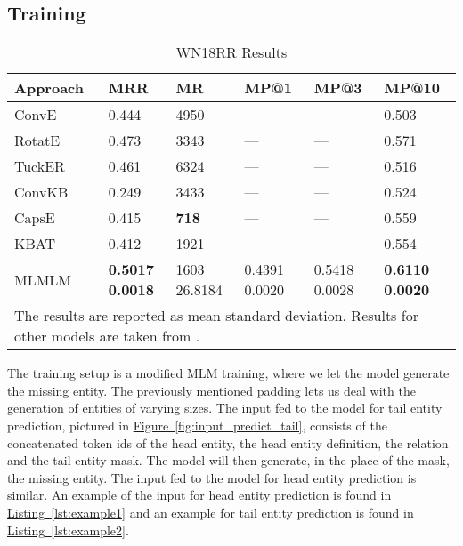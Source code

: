\documentclass[11pt,a4paper]{article}
\newcommand{\CiteT}[1]{\citet{#1}} \newcommand{\CiteP}[1]{~\citep{#1}} \newcommand{\CodeT}[1]{\texttt{#1}}
\newcommand{\RefFigure}[1]{\hyperref[#1]{Figure~\ref{#1}}}
\newcommand{\RefListing}[1]{\hyperref[#1]{Listing~\ref{#1}}}
\newcommand{\TableW}[3]{\begin{table*}[h!]
\begin{center}
  \caption{#3} 
  \vspace{-0.25\baselineskip}
  \label{#2}
  #1
\end{center}
\end{table*}}
\begin{document}
\subsection{Training}

\TableW{\begin{tabular}{m{}m{}m{0.1\textwidth}m{0.1\textwidth}m{0.1\textwidth}m{0.1\textwidth}}
    \toprule
    Approach & MRR  & MR  & MP@1  & MP@3  & MP@10 \\
    \midrule
    ConvE & 0.444 & 4950 & --- & --- & 0.503\\
    RotatE & 0.473 & 3343 & --- & --- & 0.571\\
    TuckER & 0.461 & 6324 & --- & --- & 0.516\\
    \midrule
    ConvKB & 0.249 & 3433 & --- & --- & 0.524\\
    CapsE & 0.415 & \textbf{718} & --- & --- & 0.559\\
    KBAT & 0.412 & 1921 & --- & --- & 0.554\\
    \midrule
    MLMLM & 
        \shortstack[l]{\textbf{0.5017}\\\textbf{\small 0.0018}} &
        \shortstack[l]{1603\\{\small 26.8184}} &
        \shortstack[l]{{0.4391}\\{\small 0.0020}} &
        \shortstack[l]{{0.5418}\\{\small 0.0028}} &
        \shortstack[l]{\textbf{0.6110}\\\textbf{\small 0.0020}}\\
    \bottomrule
    \multicolumn{6}{p{.8\textwidth}}{\small The results are reported as mean  standard deviation. Results for other models are taken from \CiteT{ReevaluationKB}.}
  \end{tabular}}
{tab:results_WN18}
{WN18RR Results}





The training setup is a modified MLM training, where we let the model generate the missing entity.
The previously mentioned padding lets us deal with the generation of entities of varying sizes.
The input fed to the model for tail entity prediction, pictured in \RefFigure{fig:input_predict_tail}, consists of the concatenated token ids of the head entity, the head entity definition, the relation and the tail entity mask.
The model will then generate, in the place of the mask, the missing entity.
The input fed to the model for head entity prediction is similar.
An example of the input for head entity prediction is found in \RefListing{lst:example1} and an example for tail entity prediction is found in \RefListing{lst:example2}.
\end{document}
